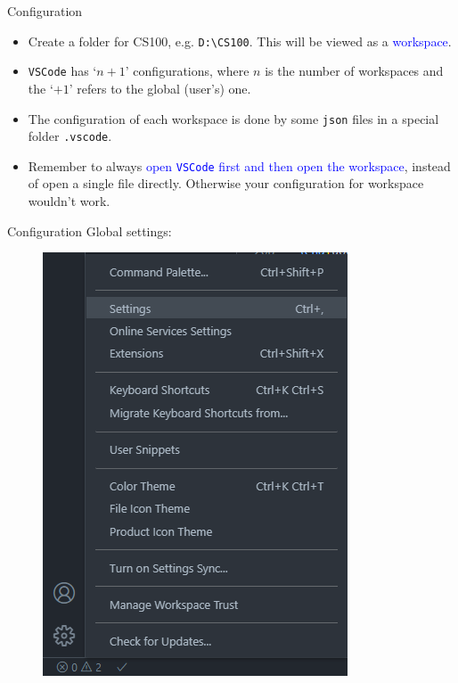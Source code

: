 \documentclass[handout]{beamer}
\newcommand{\blue}[1]{\textcolor{blue}{#1}}
\begin{document}
\begin{frame}{Configuration}
    \begin{itemize}
        \item Create a folder for CS100, e.g. \texttt{D:\textbackslash CS100}. This will be viewed as a \blue{workspace}.
        \pause
        \item \texttt{VSCode} has `\(n+1\)' configurations, where \(n\) is the number of workspaces and the `\(+1\)' refers to the global (user's) one.
        \item The configuration of each workspace is done by some \texttt{json} files in a special folder \texttt{.vscode}.
        \pause
        \item Remember to always \blue{open \texttt{VSCode} first and then open the workspace}, instead of open a single file directly. Otherwise your configuration for workspace wouldn't work.
    \end{itemize}
\end{frame}

\begin{frame}{Configuration}
    Global settings:
    \begin{figure}[h]
        \centering
        \includegraphics[height=0.75\textheight]{figures/vsc_global.png}
    \end{figure}
\end{frame}
\end{document}

